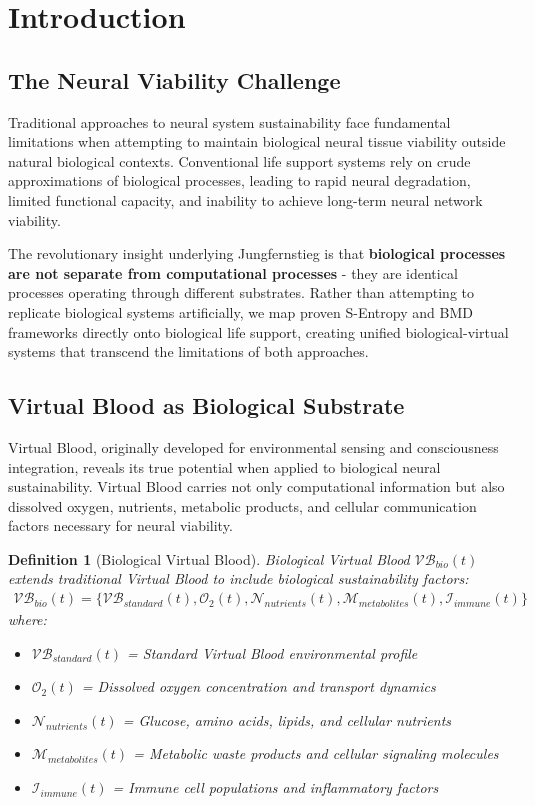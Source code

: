\documentclass[12pt,a4paper]{article}
\newtheorem{definition}{Definition}
\begin{document}
\section{Introduction}

\subsection{The Neural Viability Challenge}

Traditional approaches to neural system sustainability face fundamental limitations when attempting to maintain biological neural tissue viability outside natural biological contexts. Conventional life support systems rely on crude approximations of biological processes, leading to rapid neural degradation, limited functional capacity, and inability to achieve long-term neural network viability.

The revolutionary insight underlying Jungfernstieg is that \textbf{biological processes are not separate from computational processes} - they are identical processes operating through different substrates. Rather than attempting to replicate biological systems artificially, we map proven S-Entropy and BMD frameworks directly onto biological life support, creating unified biological-virtual systems that transcend the limitations of both approaches.

\subsection{Virtual Blood as Biological Substrate}

Virtual Blood, originally developed for environmental sensing and consciousness integration, reveals its true potential when applied to biological neural sustainability. Virtual Blood carries not only computational information but also dissolved oxygen, nutrients, metabolic products, and cellular communication factors necessary for neural viability.

\begin{definition}[Biological Virtual Blood]
Biological Virtual Blood $\mathcal{VB}_{bio}(t)$ extends traditional Virtual Blood to include biological sustainability factors:
\begin{align}
\mathcal{VB}_{bio}(t) = \{\mathcal{VB}_{standard}(t), \mathcal{O}_2(t), \mathcal{N}_{nutrients}(t), \mathcal{M}_{metabolites}(t), \mathcal{I}_{immune}(t)\}
\end{align}
where:
\begin{itemize}
\item $\mathcal{VB}_{standard}(t)$ = Standard Virtual Blood environmental profile
\item $\mathcal{O}_2(t)$ = Dissolved oxygen concentration and transport dynamics
\item $\mathcal{N}_{nutrients}(t)$ = Glucose, amino acids, lipids, and cellular nutrients
\item $\mathcal{M}_{metabolites}(t)$ = Metabolic waste products and cellular signaling molecules
\item $\mathcal{I}_{immune}(t)$ = Immune cell populations and inflammatory factors
\end{itemize}
\end{definition}
\end{document}
